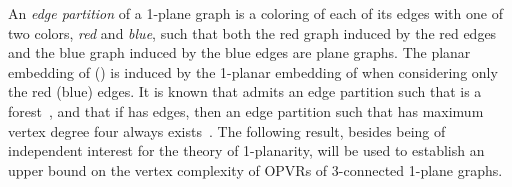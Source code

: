 \documentclass{article}
\newcommand{\opvr}{OPVR\xspace}
\begin{document}
An \emph{edge partition}  of a 1-plane graph  is a coloring of each of its edges with one of two colors, \emph{red} and \emph{blue}, such that both the red graph  induced by the red edges and the blue graph  induced by the blue edges are plane graphs. 
The planar embedding of  () is induced by the 1-planar embedding of  when considering only the red (blue) edges. 
It is known that  admits an edge partition such that  is a forest~\cite{DBLP:journals/dam/Ackerman14,DBLP:journals/combinatorics/CzapH13}, and that if   has  edges, then an edge partition such that  has maximum vertex degree four always exists~\cite{Lenhart201759}. 
The following result, besides being of independent interest for the theory of 1-planarity, will be used to establish an upper bound on the vertex complexity of {\opvr}s of 3-connected 1-plane graphs.
\end{document}
